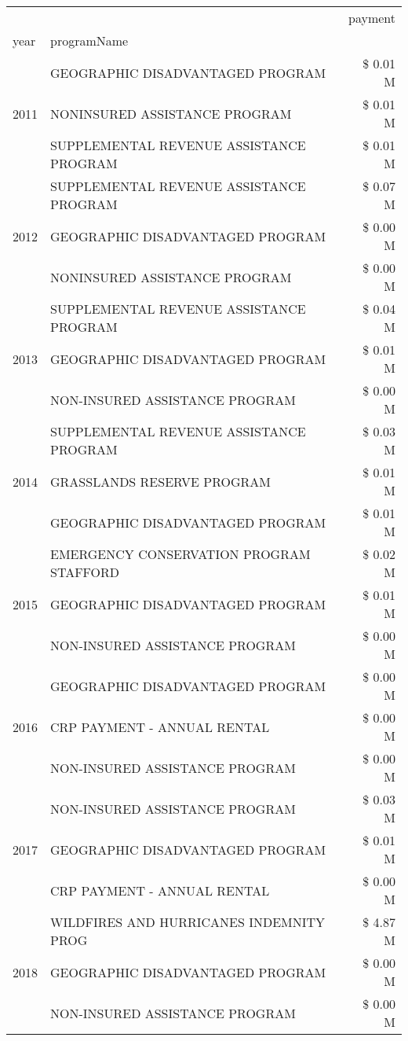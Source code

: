 \begin{tabular}{llr}
\toprule
 &  & payment \\
year & programName &  \\
\midrule
\multirow[t]{3}{*}{2011} & GEOGRAPHIC DISADVANTAGED PROGRAM & \$ 0.01 M \\
 & NONINSURED ASSISTANCE PROGRAM & \$ 0.01 M \\
 & SUPPLEMENTAL REVENUE ASSISTANCE PROGRAM & \$ 0.01 M \\
\cline{1-3}
\multirow[t]{3}{*}{2012} & SUPPLEMENTAL REVENUE ASSISTANCE PROGRAM & \$ 0.07 M \\
 & GEOGRAPHIC DISADVANTAGED PROGRAM & \$ 0.00 M \\
 & NONINSURED ASSISTANCE PROGRAM & \$ 0.00 M \\
\cline{1-3}
\multirow[t]{3}{*}{2013} & SUPPLEMENTAL REVENUE ASSISTANCE PROGRAM & \$ 0.04 M \\
 & GEOGRAPHIC DISADVANTAGED PROGRAM & \$ 0.01 M \\
 & NON-INSURED ASSISTANCE PROGRAM & \$ 0.00 M \\
\cline{1-3}
\multirow[t]{3}{*}{2014} & SUPPLEMENTAL REVENUE ASSISTANCE PROGRAM & \$ 0.03 M \\
 & GRASSLANDS RESERVE PROGRAM & \$ 0.01 M \\
 & GEOGRAPHIC DISADVANTAGED PROGRAM & \$ 0.01 M \\
\cline{1-3}
\multirow[t]{3}{*}{2015} & EMERGENCY CONSERVATION PROGRAM STAFFORD & \$ 0.02 M \\
 & GEOGRAPHIC DISADVANTAGED PROGRAM & \$ 0.01 M \\
 & NON-INSURED ASSISTANCE PROGRAM & \$ 0.00 M \\
\cline{1-3}
\multirow[t]{3}{*}{2016} & GEOGRAPHIC DISADVANTAGED PROGRAM & \$ 0.00 M \\
 & CRP PAYMENT - ANNUAL RENTAL & \$ 0.00 M \\
 & NON-INSURED ASSISTANCE PROGRAM & \$ 0.00 M \\
\cline{1-3}
\multirow[t]{3}{*}{2017} & NON-INSURED ASSISTANCE PROGRAM & \$ 0.03 M \\
 & GEOGRAPHIC DISADVANTAGED PROGRAM & \$ 0.01 M \\
 & CRP PAYMENT - ANNUAL RENTAL & \$ 0.00 M \\
\cline{1-3}
\multirow[t]{3}{*}{2018} & WILDFIRES AND HURRICANES INDEMNITY PROG & \$ 4.87 M \\
 & GEOGRAPHIC DISADVANTAGED PROGRAM & \$ 0.00 M \\
 & NON-INSURED ASSISTANCE PROGRAM & \$ 0.00 M \\

\end{tabular}
